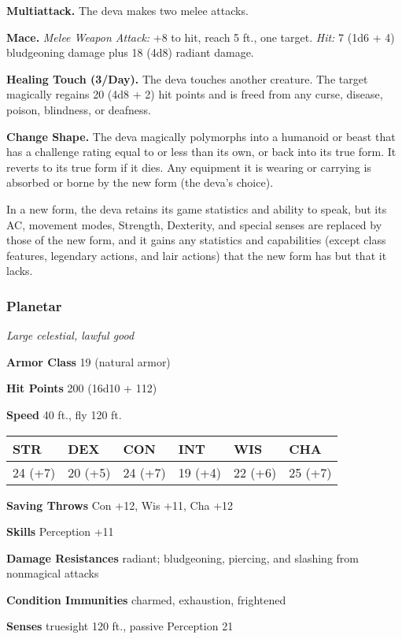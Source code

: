 \documentclass[
]{article}
\begin{document}
\textbf{Multiattack.} The deva makes two melee attacks.

\textbf{Mace.} \emph{Melee Weapon Attack:} +8 to hit, reach 5 ft., one
target. \emph{Hit:} 7 (1d6 + 4) bludgeoning damage plus 18 (4d8) radiant
damage.

\textbf{Healing Touch (3/Day).} The deva touches another creature. The
target magically regains 20 (4d8 + 2) hit points and is freed from any
curse, disease, poison, blindness, or deafness.

\textbf{Change Shape.} The deva magically polymorphs into a humanoid or
beast that has a challenge rating equal to or less than its own, or back
into its true form. It reverts to its true form if it dies. Any
equipment it is wearing or carrying is absorbed or borne by the new form
(the deva's choice).

In a new form, the deva retains its game statistics and ability to
speak, but its AC, movement modes, Strength, Dexterity, and special
senses are replaced by those of the new form, and it gains any
statistics and capabilities (except class features, legendary actions,
and lair actions) that the new form has but that it lacks.

\hypertarget{planetar}{%
\subsubsection{Planetar}\label{planetar}}

\emph{Large celestial, lawful good}

\textbf{Armor Class} 19 (natural armor)

\textbf{Hit Points} 200 (16d10 + 112)

\textbf{Speed} 40 ft., fly 120 ft.

\begin{longtable}[]{@{}llllll@{}}
\toprule
STR & DEX & CON & INT & WIS & CHA\tabularnewline
\midrule
\endhead
24 (+7) & 20 (+5) & 24 (+7) & 19 (+4) & 22 (+6) & 25 (+7)\tabularnewline
\bottomrule
\end{longtable}

\textbf{Saving Throws} Con +12, Wis +11, Cha +12

\textbf{Skills} Perception +11

\textbf{Damage Resistances} radiant; bludgeoning, piercing, and slashing
from nonmagical attacks

\textbf{Condition Immunities} charmed, exhaustion, frightened

\textbf{Senses} truesight 120 ft., passive Perception 21
\end{document}
